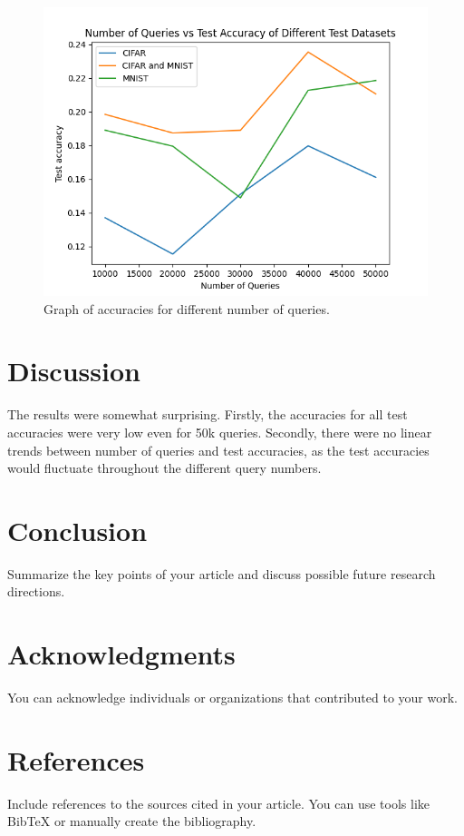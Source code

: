 \documentclass{article}
\begin{document}
\begin{figure}
    \includegraphics[width=\linewidth]{acc.png}
    \caption{Graph of accuracies for different number of queries.}
    \label{fig:graph1}
\end{figure}

\section{Discussion}
The results were somewhat surprising. Firstly, the accuracies for all test accuracies were very low even for 50k queries.
Secondly, there were no linear trends between number of queries and test accuracies, as the test accuracies would fluctuate throughout
the different query numbers.
\section{Conclusion}
Summarize the key points of your article and discuss possible future research directions.

\section*{Acknowledgments}
You can acknowledge individuals or organizations that contributed to your work.

\section*{References}
Include references to the sources cited in your article. You can use tools like BibTeX or manually create the bibliography.

\end{document}
